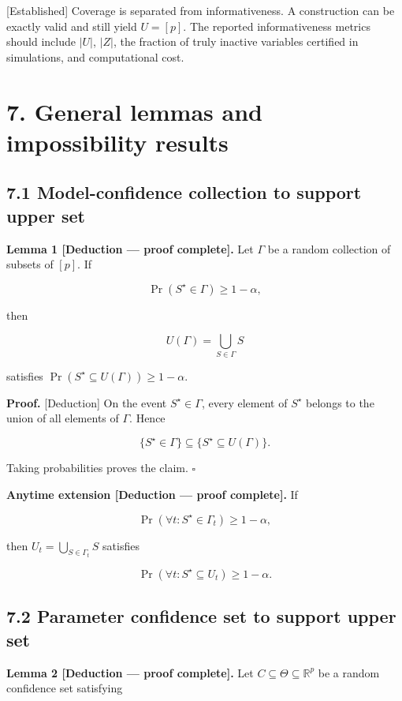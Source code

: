 \documentclass[
  english,
  11pt,
  a4paper,
]{article}
\begin{document}
{[}Established{]} Coverage is separated from informativeness. A
construction can be exactly valid and still yield $U=[p]$. The
reported informativeness metrics should include $|U|$, $|Z|$, the
fraction of truly inactive variables certified in simulations, and
computational cost.

\section{7. General lemmas and impossibility
results}\label{general-lemmas-and-impossibility-results}

\subsection{7.1 Model-confidence collection to support upper
set}\label{model-confidence-collection-to-support-upper-set}

\textbf{Lemma 1 {[}Deduction --- proof complete{]}.} Let $\Gamma$ be a
random collection of subsets of $[p]$. If

$$
\Pr(S^\star\in\Gamma)\ge1-\alpha,
$$

then

$$
U(\Gamma)=\bigcup_{S\in\Gamma}S
$$

satisfies $\Pr(S^\star\subseteq U(\Gamma))\ge1-\alpha$.

\textbf{Proof.} {[}Deduction{]} On the event $S^\star\in\Gamma$, every
element of $S^\star$ belongs to the union of all elements of
$\Gamma$. Hence

$$
\{S^\star\in\Gamma\}\subseteq\{S^\star\subseteq U(\Gamma)\}.
$$

Taking probabilities proves the claim. $\square$

\textbf{Anytime extension {[}Deduction --- proof complete{]}.} If

$$
\Pr(\forall t:S^\star\in\Gamma_t)\ge1-\alpha,
$$

then $U_t=\bigcup_{S\in\Gamma_t}S$ satisfies

$$
\Pr(\forall t:S^\star\subseteq U_t)\ge1-\alpha.
$$

\subsection{7.2 Parameter confidence set to support upper
set}\label{parameter-confidence-set-to-support-upper-set}

\textbf{Lemma 2 {[}Deduction --- proof complete{]}.} Let
$C\subseteq\Theta\subseteq\mathbb R^p$ be a random confidence set
satisfying
\end{document}
